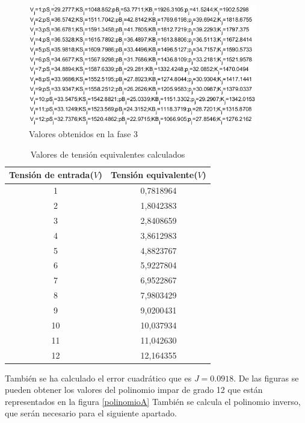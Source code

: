 \documentclass[a4paper]{article}
\begin{document}
\begin{figure}[htbp]
	\begin{center}
		\includegraphics[width=10cm]{valores_fase_3}
		\caption{Valores obtenidos en la fase 3}
		\label{valoresK}
	\end{center}
\end{figure}

\begin{table}[hbt]
	\begin{center}
		\begin{tabular}{c c}
			Tensión de entrada($V$) & Tensión equivalente($V$) \\
			\hline
			1 & 0,7818964 \\
			2 & 1,8042383 \\
			3 & 2,8408659 \\
			4 & 3,8612983 \\
			5 & 4,8823767 \\
			6 & 5,9227804 \\
			7 & 6,9522867 \\
			8 & 7,9803429 \\
			9 & 9,0200431 \\
			10 & 10,037934 \\
			11 & 11,042630 \\
			12 & 12,164355 \\
			\end{tabular}
	\end{center}
	\caption{Valores de tensión equivalentes calculados}
	\label{veq}
\end{table}

También se ha calculado el error cuadrático que es $J=0.0918$. De las figuras se pueden obtener los valores del polinomio impar de grado 12 que están representados en la figura \ref{polinomioA}
También se calcula el polinomio inverso, que serán necesario para el siguiente apartado.
\end{document}

